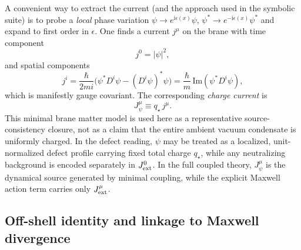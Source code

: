\documentclass[11pt]{article}
\newcommand{\ii}{\mathrm i}
\newcommand{\qstar}{q_\star}
\newcommand{\Jpsi}{J_\psi}
\newcommand{\Jext}{J_{\rm ext}}
\begin{document}
A convenient way to extract the current (and the approach used in the symbolic
suite) is to probe a \emph{local} phase variation
\(\psi\to e^{\ii \epsilon(x)}\psi\), \(\psi^*\to e^{-\ii \epsilon(x)}\psi^*\)
and expand to first order in \(\epsilon\). One finds a current \(j^\mu\) on the
brane with time component
\begin{equation}
  j^0 = |\psi|^2,
  \label{eq:j0}
\end{equation}
and spatial components
\begin{equation}
  j^i
  = \frac{\hbar}{2mi}\Big(\psi^* D^i\psi - (D^i\psi)^*\psi\Big)
  = \frac{\hbar}{m}\,\mathrm{Im}\!\left(\psi^* D^i\psi\right),
  \label{eq:ji_covariant}
\end{equation}
which is manifestly gauge covariant. The corresponding \emph{charge current} is
\begin{equation}
  \Jpsi^\mu \equiv \qstar\,j^\mu.
  \label{eq:charge_current_def}
\end{equation}
This minimal brane matter model is used here as a representative
source-consistency closure, not as a claim that the entire ambient vacuum
condensate is uniformly charged. In the defect reading, \(\psi\) may be treated as
a localized, unit-normalized defect profile carrying fixed total charge
\(\qstar\), while any neutralizing background is encoded separately in
\(\Jext^0\). In the full coupled theory, \(\Jpsi^\mu\) is the dynamical source
generated by minimal coupling, while the explicit Maxwell action term carries only
\(\Jext^\mu\).

\subsection{Off-shell identity and linkage to Maxwell divergence}
\label{sec:off_shell_identity}
\end{document}

